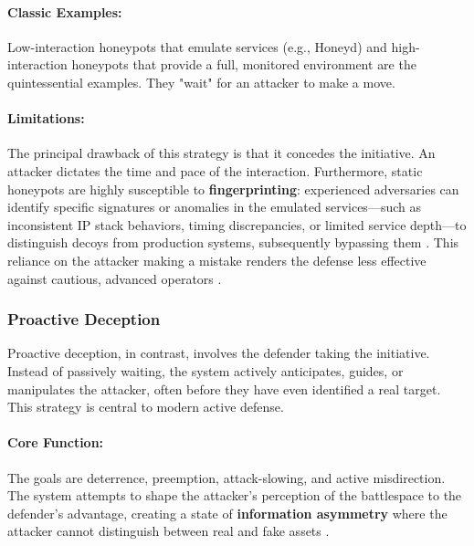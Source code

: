 \paragraph{Classic Examples:} Low-interaction honeypots that emulate services (e.g., Honeyd) \cite{provos2004virtual}
and high-interaction honeypots that provide a full, monitored environment \cite{spitzner2002honeypots} are the
quintessential examples. They "wait" for an attacker to make a move.

\paragraph{Limitations:} The principal drawback of this strategy is that it concedes the initiative. An attacker
dictates the time and pace of the interaction. Furthermore, static honeypots are highly susceptible to
\textbf{fingerprinting}: experienced adversaries can identify specific signatures or anomalies in the
emulated services—such as inconsistent IP stack behaviors, timing discrepancies, or limited service depth—to
distinguish decoys from production systems, subsequently bypassing them \cite{provos2004virtual}. This reliance
on the attacker making a mistake renders the defense less effective against cautious, advanced operators \cite{rowe2016introduction}.

\subsubsection{Proactive Deception}

Proactive deception, in contrast, involves the defender taking the initiative. Instead of passively waiting,
the system actively anticipates, guides, or manipulates the attacker, often before they have even identified
a real target. This strategy is central to modern active defense.

\paragraph{Core Function:} The goals are deterrence, preemption, attack-slowing, and active misdirection. The
system attempts to shape the attacker's perception of the battlespace to the defender's advantage, creating
a state of \textbf{information asymmetry} where the attacker cannot distinguish between real and fake assets \cite{pawlick2019game}.

